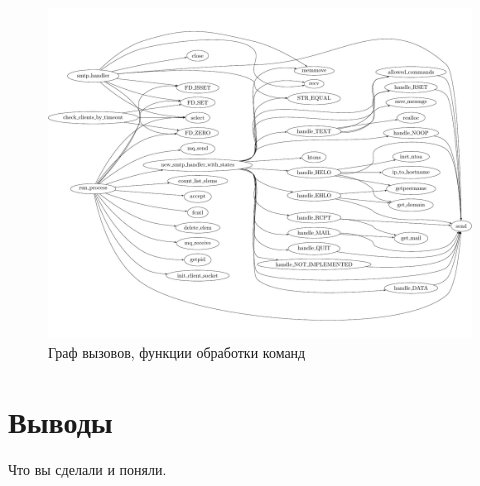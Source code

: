 \documentclass[a4paper,12pt]{report}
\begin{document}
\begin{figure}
\centering
\includegraphics[width=\textwidth]{include/scflow02_dot.pdf}
\caption{Граф вызовов, функции обработки команд}
\label{fig:scflow01}
\end{figure}

\chapter*{Выводы}

Что вы сделали и поняли.
\end{document}
